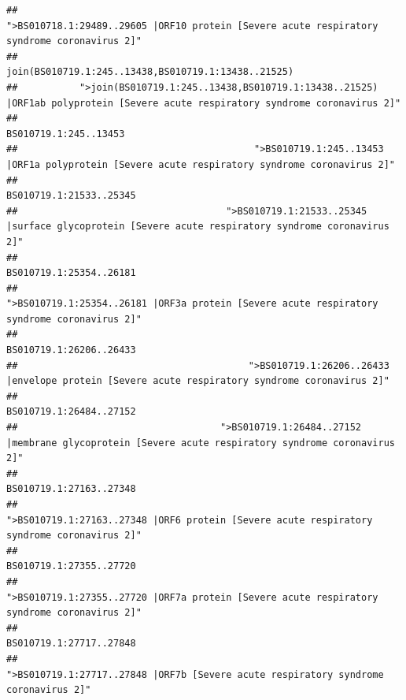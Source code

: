 \documentclass[
]{article}
\begin{document}
\begin{verbatim}
##                                            ">BS010718.1:29489..29605 |ORF10 protein [Severe acute respiratory syndrome coronavirus 2]" 
##                                                                                    join(BS010719.1:245..13438,BS010719.1:13438..21525) 
##           ">join(BS010719.1:245..13438,BS010719.1:13438..21525) |ORF1ab polyprotein [Severe acute respiratory syndrome coronavirus 2]" 
##                                                                                                                  BS010719.1:245..13453 
##                                          ">BS010719.1:245..13453 |ORF1a polyprotein [Severe acute respiratory syndrome coronavirus 2]" 
##                                                                                                                BS010719.1:21533..25345 
##                                     ">BS010719.1:21533..25345 |surface glycoprotein [Severe acute respiratory syndrome coronavirus 2]" 
##                                                                                                                BS010719.1:25354..26181 
##                                            ">BS010719.1:25354..26181 |ORF3a protein [Severe acute respiratory syndrome coronavirus 2]" 
##                                                                                                                BS010719.1:26206..26433 
##                                         ">BS010719.1:26206..26433 |envelope protein [Severe acute respiratory syndrome coronavirus 2]" 
##                                                                                                                BS010719.1:26484..27152 
##                                    ">BS010719.1:26484..27152 |membrane glycoprotein [Severe acute respiratory syndrome coronavirus 2]" 
##                                                                                                                BS010719.1:27163..27348 
##                                             ">BS010719.1:27163..27348 |ORF6 protein [Severe acute respiratory syndrome coronavirus 2]" 
##                                                                                                                BS010719.1:27355..27720 
##                                            ">BS010719.1:27355..27720 |ORF7a protein [Severe acute respiratory syndrome coronavirus 2]" 
##                                                                                                                BS010719.1:27717..27848 
##                                                    ">BS010719.1:27717..27848 |ORF7b [Severe acute respiratory syndrome coronavirus 2]" 

\end{verbatim}
\end{document}
